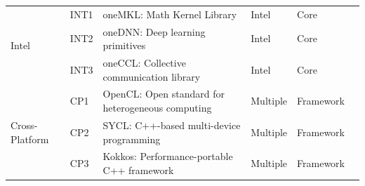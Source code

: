 \begin{table}[htbp]
\begin{tabular}{llp{8cm}lll}
		\hline
		\multirow{3}{*}{\small Intel}
		                         & \small INT1        & \small oneMKL: Math Kernel Library                                & \small Intel           & \small Core          & \small \cite{noauthor_uxlfoundationonemath_2025}      \\[1ex]
		                         & \small INT2        & \small oneDNN: Deep learning primitives                           & \small Intel           & \small Core          & \small \cite{onednn_contributors_oneapi_2025}         \\[1ex]
		                         & \small INT3        & \small oneCCL: Collective communication library                   & \small Intel           & \small Core          & \small \cite{noauthor_uxlfoundationoneccl_2025}       \\
		\hline
		\multirow{3}{*}{\small Cross-Platform}
		                         & \small CP1         & \small OpenCL: Open standard for heterogeneous computing          & \small Multiple        & \small Framework     & \small \cite{noauthor_khronosgroupopencl-sdk_2025}    \\[1ex]
		                         & \small CP2         & \small SYCL: C++-based multi-device programming                   & \small Multiple        & \small Framework     & \small \cite{noauthor_khronosgroupsycl-docs_2025}     \\[1ex]
		                         & \small CP3         & \small Kokkos: Performance-portable C++ framework                 & \small Multiple        & \small Framework     & \small \cite{trott_kokkos_2022}                       \\


\end{tabular}
\end{table}
